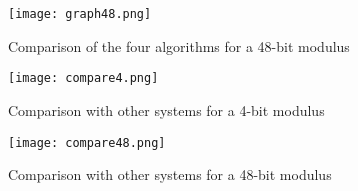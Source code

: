 \documentclass{amsart}
\theoremstyle{definition}
\theoremstyle{remark}
\begin{document}
\begin{figure}
\begin{center}
\texttt{[image: graph48.png]}
\caption{Comparison of the four algorithms for a 48-bit modulus}
\label{fig:48-bit}
\end{center}
\end{figure}


\begin{figure}
\begin{center}
\texttt{[image: compare4.png]}
\caption{Comparison with other systems for a 4-bit modulus}
\label{fig:4-bit-compare}
\end{center}
\end{figure}


\begin{figure}
\begin{center}
\texttt{[image: compare48.png]}
\caption{Comparison with other systems for a 48-bit modulus}
\label{fig:48-bit-compare}
\end{center}
\end{figure}
\end{document}

